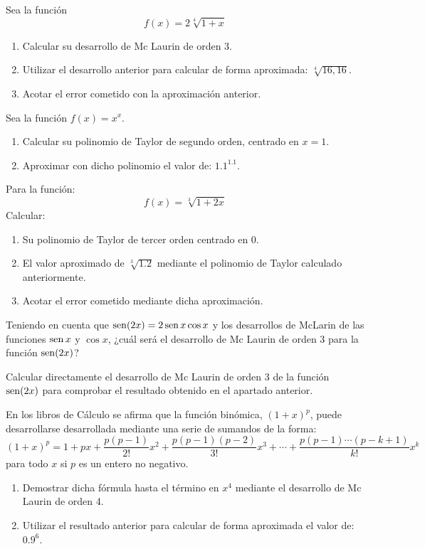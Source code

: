 {Sea la función
\[
f(x) = 2\sqrt[4]{{1 + x}}
\]
\begin{enumerate}
\item Calcular su desarrollo de Mc Laurin de orden 3.
\item Utilizar el desarrollo anterior para calcular de forma aproximada: $\sqrt[4]{{16,16}}$.
\item Acotar el error cometido con la aproximación anterior.
\end{enumerate}
}


{
Sea la función $f(x)=x^{x}.$
\begin{enumerate}
\item  Calcular su polinomio de Taylor de segundo orden, centrado en $x=1$.
\item  Aproximar con dicho polinomio el valor de: $1.1^{1.1}$.
\end{enumerate}
}


{Para la función:
\[
f(x)=\sqrt[3]{1+2x}
\]
Calcular:
\begin{enumerate}
\item  Su polinomio de Taylor de tercer orden centrado en 0.
\item  El valor aproximado de $\sqrt[3]{1.2}$ mediante el polinomio de Taylor calculado anteriormente.
\item  Acotar el error cometido mediante dicha aproximación.
\end{enumerate}
}


{Teniendo en cuenta que $\operatorname{sen} (2x)=2\operatorname{sen} x \cos x$ y los desarrollos de McLarin de las funciones $\operatorname{sen} x$ y $\cos x$, ¿cuál será el desarrollo de Mc Laurin de orden 3 para la función $\operatorname{sen} (2x)$?

Calcular directamente el desarrollo de Mc Laurin de orden 3 de la función $\operatorname{sen} (2x)$ para comprobar el resultado obtenido en el apartado anterior.
}


{En los libros de Cálculo se afirma que la función binómica, $(1+x)^p$, puede desarrollarse desarrollada mediante una serie de sumandos de la forma:
\[
\left( {1 + x} \right)^p  = 1 + px + \frac{{p(p - 1)}} {{2!}}x^2 + \frac{{p(p - 1)(p - 2)}} {{3!}}x^3  +  \cdots  + \frac{{p(p - 1) \cdots (p - k + 1)}} {{k!}}x^k
\]
para todo $x$ si $p$ es un entero no negativo.
\begin{enumerate}
\item Demostrar dicha fórmula hasta el término en $x^4$ mediante el desarrollo de Mc Laurin de orden 4.
\item Utilizar el resultado anterior para calcular de forma aproximada el valor de: $0.9^6$.
\end{enumerate}
}


